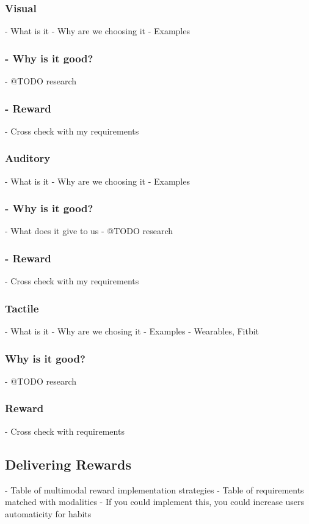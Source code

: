 \subsubsection*{Visual}
    - What is it
    - Why are we choosing it
    - Examples
    \subsubsection*{- Why is it good?}
      - @TODO research
    \subsubsection*{- Reward}
      - Cross check with my requirements

  \subsubsection*{Auditory}
      - What is it
      - Why are we choosing it
      - Examples
      \subsubsection*{- Why is it good?}
        - What does it give to us
        - @TODO research
      \subsubsection*{- Reward}
        - Cross check with my requirements
  \subsubsection*{Tactile}
      - What is it
      - Why are we chosing it
      - Examples
      - Wearables, Fitbit
    \subsubsection*{Why is it good?}
        - @TODO research
    \subsubsection*{Reward}
        - Cross check with requirements

\subsection{Delivering Rewards}
  - Table of multimodal reward implementation strategies
  - Table of requirements matched with modalities
  - If you could implement this, you could increase users automaticity for habits

